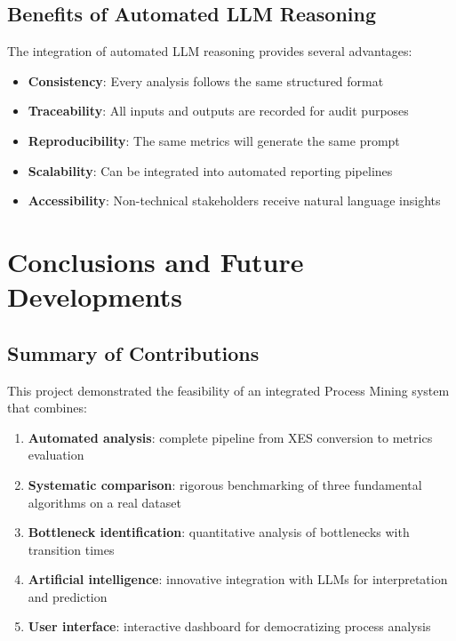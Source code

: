 \documentclass[a4paper,twoside,12pt]{article}
\begin{document}
\subsection{Benefits of Automated LLM Reasoning}

The integration of automated LLM reasoning provides several advantages:

\begin{itemize}
    \item \textbf{Consistency}: Every analysis follows the same structured format
    \item \textbf{Traceability}: All inputs and outputs are recorded for audit purposes
    \item \textbf{Reproducibility}: The same metrics will generate the same prompt
    \item \textbf{Scalability}: Can be integrated into automated reporting pipelines
    \item \textbf{Accessibility}: Non-technical stakeholders receive natural language insights
\end{itemize}

\section{Conclusions and Future Developments}

\subsection{Summary of Contributions}

This project demonstrated the feasibility of an integrated Process Mining system that combines:

\begin{enumerate}
    \item \textbf{Automated analysis}: complete pipeline from XES conversion to metrics evaluation
    \item \textbf{Systematic comparison}: rigorous benchmarking of three fundamental algorithms on a real dataset
    \item \textbf{Bottleneck identification}: quantitative analysis of bottlenecks with transition times
    \item \textbf{Artificial intelligence}: innovative integration with LLMs for interpretation and prediction
    \item \textbf{User interface}: interactive dashboard for democratizing process analysis
\end{enumerate}
\end{document}

